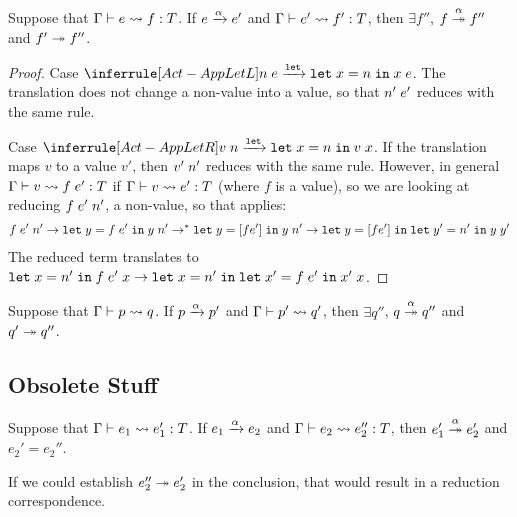 \begin{conjecture}
  Suppose that $\translation {e}{f}T$.
  If $\reduce[\alpha]{e}{e'}$
  and $\translation{e'}{f'}T$,
  then $\exists f''$,  $\reducemany[\alpha]{f}{f''}$
  and $ \reducemany{f'}{f''}$.
\end{conjecture}
\begin{proof}
  Case $\RuleActAppLetL$.
  The translation does not change a non-value into a value, so that
  $\EApp{n'}{e'}$ reduces with the same rule.

  Case $\RuleActAppLetR$. If the translation maps $v$ to a value $v'$,
  then $\EApp{v'}{n'}$ reduces with the same rule.
  However, in general $\translation{v}{\EApp f{e'}}{T}$ if
  $\translation{v}{e'}T$ (where $f$ is a value), so we are looking at reducing $\EApp{\EApp
    f{e'}}{n'}$, a non-value, so that \textsc{\ActAppLetL} applies:
  \begin{gather*}
    \EApp{\EApp f{e'}}{n'}
    \to \ELet y{\EApp f{e'}}{\EApp y{n'}}
    \to^* \ELet y{[f{e'}]}{\EApp y{n'}}
    \to \ELet y{[f{e'}]}{\ELet {y'}{n'}\EApp y{y'}}
  \end{gather*}
  The reduced term translates to $\ELet x {n'} \EApp {\EApp f{e'}} x
  \to \ELet x {n'} \ELet{x'}{\EApp f{e'}}\EApp {x'}x$.
\end{proof}

\begin{conjecture}
  Suppose that $\Ptranslation {p}{q}$.
  If $\reduce[\alpha]{p}{p'}$
  and $\Ptranslation{p'}{q'}$,
  then $\exists q''$,  $\reducemany[\alpha]{q}{q''}$
  and $ \reducemany{q'}{ q''}$.
\end{conjecture}


\subsection{Obsolete Stuff}
\label{sec:obsolete-stuff}



\begin{conjecture}[obsolete]
  Suppose that $\translation {e_1}{e_1'} T$.
  If $\reduce[\alpha]{e_1}{e_2}$
  and $\translation{e_2}{e_2''}{T}$,
  then $\reducemany[\alpha]{e_1'}{e_2'}$
  and $e_2' = e_2''$.
\end{conjecture}
If we could establish $\reducemany{e_2''}{e_2'}$ in  the
conclusion, that would result in a reduction correspondence.

